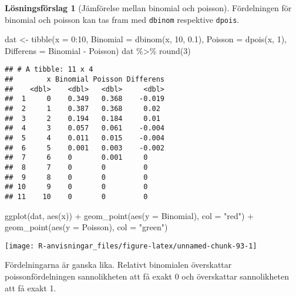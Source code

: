 \documentclass[
]{book}
\newenvironment{Shaded}{\begin{snugshade}}{\end{snugshade}}
\newcommand{\AttributeTok}[1]{\textcolor[rgb]{0.77,0.63,0.00}{#1}}
\newcommand{\DecValTok}[1]{\textcolor[rgb]{0.00,0.00,0.81}{#1}}
\newcommand{\FloatTok}[1]{\textcolor[rgb]{0.00,0.00,0.81}{#1}}
\newcommand{\FunctionTok}[1]{\textcolor[rgb]{0.00,0.00,0.00}{#1}}
\newcommand{\NormalTok}[1]{#1}
\newcommand{\OtherTok}[1]{\textcolor[rgb]{0.56,0.35,0.01}{#1}}
\newcommand{\SpecialCharTok}[1]{\textcolor[rgb]{0.00,0.00,0.00}{#1}}
\newcommand{\StringTok}[1]{\textcolor[rgb]{0.31,0.60,0.02}{#1}}
\theoremstyle{definition}
\theoremstyle{definition}
\theoremstyle{definition}
\theoremstyle{definition}
\newtheorem{hypothesis}{Lösningsförslag}[chapter]
\theoremstyle{remark}
\begin{document}
\begin{hypothesis}[Jämförelse mellan binomial och poisson]
Fördelningen för binomial och poisson kan tas fram med \texttt{dbinom} respektive \texttt{dpois}.

\begin{Shaded}
\begin{Highlighting}[]
\NormalTok{dat }\OtherTok{\textless{}{-}} \FunctionTok{tibble}\NormalTok{(}\AttributeTok{x =} \DecValTok{0}\SpecialCharTok{:}\DecValTok{10}\NormalTok{,}
              \AttributeTok{Binomial =} \FunctionTok{dbinom}\NormalTok{(x, }\DecValTok{10}\NormalTok{, }\FloatTok{0.1}\NormalTok{),}
              \AttributeTok{Poisson =} \FunctionTok{dpois}\NormalTok{(x, }\DecValTok{1}\NormalTok{),}
              \AttributeTok{Differens =}\NormalTok{ Binomial }\SpecialCharTok{{-}}\NormalTok{ Poisson)}
\NormalTok{dat }\SpecialCharTok{\%\textgreater{}\%} \FunctionTok{round}\NormalTok{(}\DecValTok{3}\NormalTok{)}
\end{Highlighting}
\end{Shaded}

\begin{verbatim}
## # A tibble: 11 x 4
##        x Binomial Poisson Differens
##    <dbl>    <dbl>   <dbl>     <dbl>
##  1     0    0.349   0.368    -0.019
##  2     1    0.387   0.368     0.02 
##  3     2    0.194   0.184     0.01 
##  4     3    0.057   0.061    -0.004
##  5     4    0.011   0.015    -0.004
##  6     5    0.001   0.003    -0.002
##  7     6    0       0.001     0    
##  8     7    0       0         0    
##  9     8    0       0         0    
## 10     9    0       0         0    
## 11    10    0       0         0
\end{verbatim}

\begin{Shaded}
\begin{Highlighting}[]
\FunctionTok{ggplot}\NormalTok{(dat, }\FunctionTok{aes}\NormalTok{(x)) }\SpecialCharTok{+}
  \FunctionTok{geom\_point}\NormalTok{(}\FunctionTok{aes}\NormalTok{(}\AttributeTok{y =}\NormalTok{ Binomial), }\AttributeTok{col =} \StringTok{"red"}\NormalTok{) }\SpecialCharTok{+}
  \FunctionTok{geom\_point}\NormalTok{(}\FunctionTok{aes}\NormalTok{(}\AttributeTok{y =}\NormalTok{ Poisson), }\AttributeTok{col =} \StringTok{"green"}\NormalTok{)}
\end{Highlighting}
\end{Shaded}

\begin{center}\texttt{[image: R-anvisningar\_files/figure-latex/unnamed-chunk-93-1]} \end{center}

Fördelningarna är ganska lika. Relativt binomialen överskattar poissonfördelningen sannolikheten att få exakt 0 och överskattar sannolikheten att få exakt 1.
\end{hypothesis}
\end{document}
